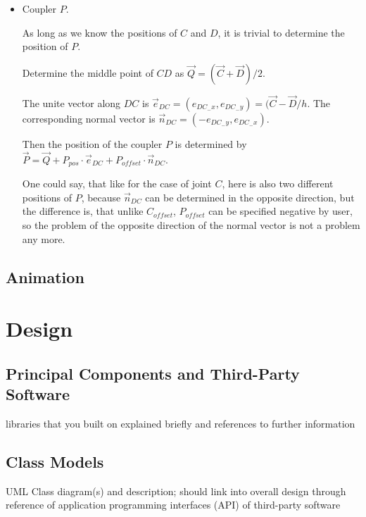 \documentclass{article}
\begin{document}
\begin{itemize}
 	\item Coupler $P$.
 	
 	As long as we know the positions of $C$ and $D$, it is trivial to determine the position of $P$.
 	
 	Determine the middle point of $CD$ as $\overrightarrow{Q} = (\overrightarrow{C} + \overrightarrow{D})/2$.
 	
 	The unite vector along $DC$ is $\overrightarrow{e}_{DC} = (e_{DC_-x}, e_{DC_-y}) = (\overrightarrow{C} - \overrightarrow{D} / h$. The corresponding normal vector is $\overrightarrow{n}_{DC} = (-e_{DC_-y}, e_{DC_-x})$.
 	
 	Then the position of the coupler $P$ is determined by $\overrightarrow{P} = \overrightarrow{Q} + P_{pos} \cdot \overrightarrow{e}_{DC} + P_{offset} \cdot \overrightarrow{n}_{DC}$.
 	
 	One could say, that like for the case of joint $C$, here is also two different positions of $P$, because $\overrightarrow{n}_{DC}$ can be determined in the opposite direction, but the difference is, that unlike $C_{offset}$, $P_{offset}$ can be specified negative by user, so the problem of the opposite direction of the normal vector is not a problem any more.
 \end{itemize}




\subsection{Animation}

\section{Design} \label{ch:design}

\subsection{Principal Components and Third-Party Software}

libraries that you built on explained briefly and references to further information

\subsection{Class Models}

UML Class diagram(s) and description; should link into overall design through
reference of application programming interfaces (API) of third-party software
\end{document}
